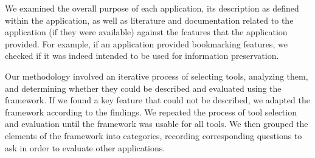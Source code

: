 \documentclass[review]{elsarticle}
\begin{document}
{%
We examined the overall purpose of each application, its description as defined within the application, as well as literature and documentation related to the application (if they were available) against the features that the application provided. For example, if an application provided bookmarking features, we checked if it was indeed intended to be used for information preservation. 

Our methodology involved an iterative process of selecting tools, analyzing them, and determining whether they could be described and evaluated using the framework. If we found a key feature that could not be described, we adapted the framework according to the findings. We repeated the process of tool selection and evaluation until the framework was usable for all tools. We then grouped the elements of the framework into categories, recording corresponding questions to ask in order to evaluate other applications. 
%

\begin{table}[htbp]
\small
\begin{tabular}{|p{}| p{}| p{}|}


\end{tabular}
\end{table}}
\end{document}
